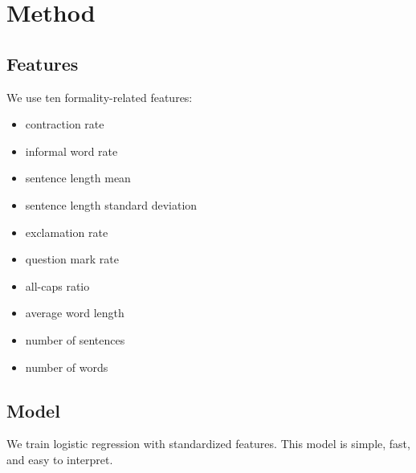 \section{Method}

\subsection{Features}

We use ten formality-related features:
\begin{itemize}
  \item contraction rate
  \item informal word rate
  \item sentence length mean
  \item sentence length standard deviation
  \item exclamation rate
  \item question mark rate
  \item all-caps ratio
  \item average word length
  \item number of sentences
  \item number of words
\end{itemize}

\subsection{Model}

We train logistic regression with standardized features. This model is simple,
fast, and easy to interpret.
